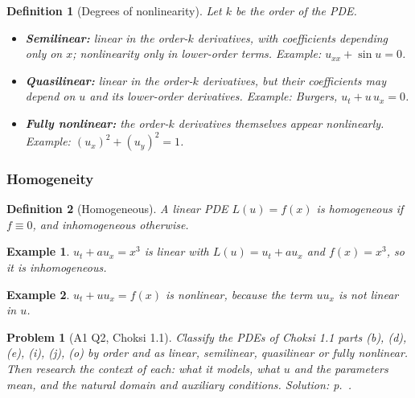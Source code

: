 \documentclass{article}
\newtheorem{definition}{Definition}
\newtheorem{problem}{Problem}
\newtheorem*{example}{Example}
\begin{document}
\begin{definition}[Degrees of nonlinearity]
    Let $k$ be the order of the PDE.
    \begin{itemize}
        \item \textbf{Semilinear:} linear in the order-$k$ derivatives, with coefficients depending only on $x$; nonlinearity only in lower-order terms. Example: $u_{xx} + \sin u = 0$.
        \item \textbf{Quasilinear:} linear in the order-$k$ derivatives, but their coefficients may depend on $u$ and its lower-order derivatives. Example: Burgers, $u_t + u\,u_x = 0$.
        \item \textbf{Fully nonlinear:} the order-$k$ derivatives themselves appear nonlinearly. Example: $(u_x)^2 + (u_y)^2 = 1$.
    \end{itemize}
\end{definition}

\subsubsection{Homogeneity}
\begin{definition}[Homogeneous]
    A linear PDE $L(u) = f(x)$ is homogeneous if $f \equiv 0$, and inhomogeneous otherwise.
\end{definition}
\begin{example}
    $u_t + a u_x = x^3$ is linear with $L(u) = u_t + a u_x$ and $f(x) = x^3$, so it is inhomogeneous.
\end{example}
\begin{example}
    $u_t + u u_x = f(x)$ is nonlinear, because the term $u u_x$ is not linear in $u$.
\end{example}

\begin{problem}[A1 Q2, Choksi 1.1]\label{prob:a1-11}
    Classify the PDEs of Choksi 1.1 parts (b), (d), (e), (i), (j), (o) by order and as linear, semilinear, quasilinear or fully nonlinear. Then research the context of each: what it models, what $u$ and the parameters mean, and the natural domain and auxiliary conditions.
    \hfill \emph{Solution: p.~\pageref{sol:a1-11}.}
\end{problem}
\end{document}
